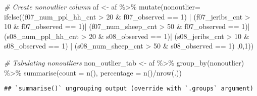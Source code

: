 \documentclass[
]{article}
\newenvironment{Shaded}{\begin{snugshade}}{\end{snugshade}}
\newcommand{\AttributeTok}[1]{\textcolor[rgb]{0.77,0.63,0.00}{#1}}
\newcommand{\CommentTok}[1]{\textcolor[rgb]{0.56,0.35,0.01}{\textit{#1}}}
\newcommand{\DecValTok}[1]{\textcolor[rgb]{0.00,0.00,0.81}{#1}}
\newcommand{\FunctionTok}[1]{\textcolor[rgb]{0.00,0.00,0.00}{#1}}
\newcommand{\NormalTok}[1]{#1}
\newcommand{\OtherTok}[1]{\textcolor[rgb]{0.56,0.35,0.01}{#1}}
\newcommand{\SpecialCharTok}[1]{\textcolor[rgb]{0.00,0.00,0.00}{#1}}
\begin{document}
\begin{Shaded}
\begin{Highlighting}[]
\CommentTok{\# Create nonoutlier column}
\NormalTok{af }\OtherTok{\textless{}{-}}\NormalTok{ af }\SpecialCharTok{\%\textgreater{}\%} \FunctionTok{mutate}\NormalTok{(}\AttributeTok{nonoutlier=} \FunctionTok{ifelse}\NormalTok{((f07\_num\_ppl\_hh\_cnt }\SpecialCharTok{\textgreater{}} \DecValTok{20} \SpecialCharTok{\&}\NormalTok{ f07\_observed }\SpecialCharTok{==} \DecValTok{1}\NormalTok{) }\SpecialCharTok{|}
\NormalTok{                                    (f07\_jeribs\_cnt }\SpecialCharTok{\textgreater{}} \DecValTok{10} \SpecialCharTok{\&}\NormalTok{ f07\_observed }\SpecialCharTok{==} \DecValTok{1}\NormalTok{)}\SpecialCharTok{|}
\NormalTok{                                    (f07\_num\_sheep\_cnt }\SpecialCharTok{\textgreater{}} \DecValTok{50} \SpecialCharTok{\&}\NormalTok{ f07\_observed }\SpecialCharTok{==} \DecValTok{1}\NormalTok{)}\SpecialCharTok{|}
\NormalTok{                                      (s08\_num\_ppl\_hh\_cnt }\SpecialCharTok{\textgreater{}} \DecValTok{20} \SpecialCharTok{\&}\NormalTok{ s08\_observed }\SpecialCharTok{==} \DecValTok{1}\NormalTok{)}\SpecialCharTok{|}
\NormalTok{                                      (s08\_jeribs\_cnt }\SpecialCharTok{\textgreater{}} \DecValTok{10} \SpecialCharTok{\&}\NormalTok{ s08\_observed }\SpecialCharTok{==} \DecValTok{1}\NormalTok{) }\SpecialCharTok{|}
\NormalTok{                                      (s08\_num\_sheep\_cnt }\SpecialCharTok{\textgreater{}} \DecValTok{50} \SpecialCharTok{\&}\NormalTok{ s08\_observed }\SpecialCharTok{==} \DecValTok{1}\NormalTok{)}
\NormalTok{                                      ,}\DecValTok{0}\NormalTok{,}\DecValTok{1}\NormalTok{))}


\CommentTok{\# Tabulating nonoutliers}
\NormalTok{non\_outlier\_tab }\OtherTok{\textless{}{-}}\NormalTok{ af }\SpecialCharTok{\%\textgreater{}\%} \FunctionTok{group\_by}\NormalTok{(nonoutlier) }\SpecialCharTok{\%\textgreater{}\%} 
    \FunctionTok{summarise}\NormalTok{(}\AttributeTok{count =} \FunctionTok{n}\NormalTok{(), }\AttributeTok{percentage =} \FunctionTok{n}\NormalTok{()}\SpecialCharTok{/}\FunctionTok{nrow}\NormalTok{(.))}
\end{Highlighting}
\end{Shaded}

\begin{verbatim}
## `summarise()` ungrouping output (override with `.groups` argument)
\end{verbatim}
\end{document}
